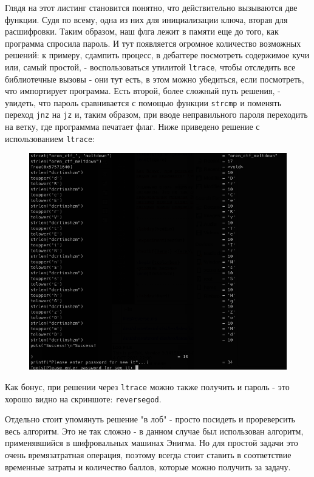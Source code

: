 \documentclass[idxtotoc,hyperref,openany,oneside]{files/reverse} %
\begin{document}
Глядя на этот листинг становится понятно, что действительно вызываются две функции. Судя по всему, одна из них для инициализации ключа, вторая для расшифровки. Таким образом, наш флга лежит в памяти еще до того, как программа спросила пароль. И тут появляется огромное количество возможных решений: к примеру, сдампить процесс, в дебаггере посмотреть содержимое кучи или, самый простой, - воспользоваться утилитой \verb|ltrace|, чтобы отследить все библиотечные вызовы - они тут есть, в этом можно убедиться, если посмотреть, что импортирует программа. Есть второй, более сложный путь решения, - увидеть, что пароль сравнивается с помощью функции \verb|strcmp| и поменять переход \verb|jnz| на \verb|jz| и, таким образом, при вводе неправильного пароля переходить на ветку, где программма печатает флаг. Ниже приведено решение с использованием \verb|ltrace|:
\begin{figure}[H]
\begin{center}
\includegraphics[width=1.0\linewidth]{files/enigma-ltrace}
\end{center}
\label{fig:enigma-asm}
\end{figure}

Как бонус, при решении через \verb|ltrace| можно также получить и пароль - это хорошо видно на скриншоте: \verb|reversegod|.

Отдельно стоит упомянуть решение "в лоб"{} - просто посидеть и прореверсить весь алгоритм. Это не так сложно - в данном случае был использован алгоритм, применявшийся в шифровальных машинах Энигма. Но для простой задачи это очень времязатратная операция, поэтому всегда стоит ставить в соответствие временные затраты и количество баллов, которые можно получить за задачу.
\end{document}
